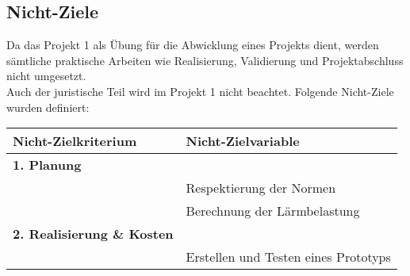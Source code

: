 \subsection{Nicht-Ziele}
Da das Projekt 1 als Übung für die Abwicklung eines Projekts dient, werden sämtliche praktische Arbeiten wie Realisierung, Validierung und Projektabschluss nicht umgesetzt.\\
Auch der juristische Teil wird im Projekt 1 nicht beachtet.
Folgende Nicht-Ziele wurden definiert:
\begin{table}[H]
\begin{tabular}{ll}
\textbf{Nicht-Zielkriterium}				&\textbf{Nicht-Zielvariable}											\\
\hline
\rowcolor{grau}
\textbf{1. Planung}						&																	\\
										&Respektierung der Normen											\\
										&Berechnung der Lärmbelastung														\\	
\rowcolor{grau}
\textbf{2. Realisierung \& Kosten}		&																	\\
										&Erstellen und Testen eines Prototyps								\\
	
\hline
\end{tabular}
\end{table}
